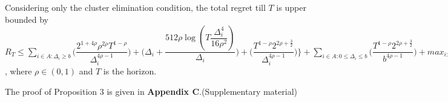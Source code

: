 \begin{remark}
\end{remark}
	
	
	

\begin{proposition}
Considering only the cluster elimination condition, the total regret till $T$ is upper bounded by $R_{T}\leq \sum_{i\in A:\Delta_{i}\geq b}\bigg(\dfrac{2^{1+4\rho}\rho^{2\rho}T^{1-\rho}}{\Delta_{i}^{4\rho-1}}\bigg) + \bigg(\Delta_{i}+\dfrac{512\rho\log{(T\dfrac{\Delta_{i}^{4}}{16\rho^{2}})}}{\Delta_{i}}\bigg)  +  \bigg(\dfrac{T^{1-\rho}2^{2\rho+\frac{3}{2}}}{\Delta_{i}^{4\rho -1}} \bigg) \bigg \rbrace+\sum_{i\in A:0\leq\Delta_{i}\leq b}\bigg(\dfrac{T^{1-\rho}2^{2\rho+\frac{3}{2}}}{b^{4\rho -1}} \bigg) + max_{i:\Delta\leq b}\Delta_{i}T$, where $\rho\in (0,1)$ and $T$ is the horizon.
\end{proposition}

	The proof of Proposition 3 is given in \textbf{Appendix C}.(Supplementary material)



